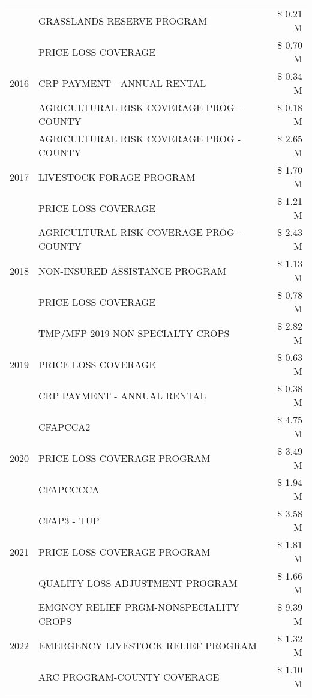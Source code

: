 \begin{tabular}{llr}
 & GRASSLANDS RESERVE PROGRAM & \$ 0.21 M \\
\cline{1-3}
\multirow[t]{3}{*}{2016} & PRICE LOSS COVERAGE & \$ 0.70 M \\
 & CRP PAYMENT - ANNUAL RENTAL & \$ 0.34 M \\
 & AGRICULTURAL RISK COVERAGE PROG - COUNTY & \$ 0.18 M \\
\cline{1-3}
\multirow[t]{3}{*}{2017} & AGRICULTURAL RISK COVERAGE PROG - COUNTY & \$ 2.65 M \\
 & LIVESTOCK FORAGE PROGRAM & \$ 1.70 M \\
 & PRICE LOSS COVERAGE & \$ 1.21 M \\
\cline{1-3}
\multirow[t]{3}{*}{2018} & AGRICULTURAL RISK COVERAGE PROG - COUNTY & \$ 2.43 M \\
 & NON-INSURED ASSISTANCE PROGRAM & \$ 1.13 M \\
 & PRICE LOSS COVERAGE & \$ 0.78 M \\
\cline{1-3}
\multirow[t]{3}{*}{2019} & TMP/MFP 2019 NON SPECIALTY CROPS & \$ 2.82 M \\
 & PRICE LOSS COVERAGE & \$ 0.63 M \\
 & CRP PAYMENT - ANNUAL RENTAL & \$ 0.38 M \\
\cline{1-3}
\multirow[t]{3}{*}{2020} & CFAPCCA2 & \$ 4.75 M \\
 & PRICE LOSS COVERAGE PROGRAM & \$ 3.49 M \\
 & CFAPCCCCA & \$ 1.94 M \\
\cline{1-3}
\multirow[t]{3}{*}{2021} & CFAP3 - TUP & \$ 3.58 M \\
 & PRICE LOSS COVERAGE PROGRAM & \$ 1.81 M \\
 & QUALITY LOSS ADJUSTMENT PROGRAM & \$ 1.66 M \\
\cline{1-3}
\multirow[t]{3}{*}{2022} & EMGNCY RELIEF PRGM-NONSPECIALITY CROPS & \$ 9.39 M \\
 & EMERGENCY LIVESTOCK RELIEF PROGRAM & \$ 1.32 M \\
 & ARC PROGRAM-COUNTY COVERAGE & \$ 1.10 M \\
\cline{1-3}
\bottomrule
\end{tabular}
